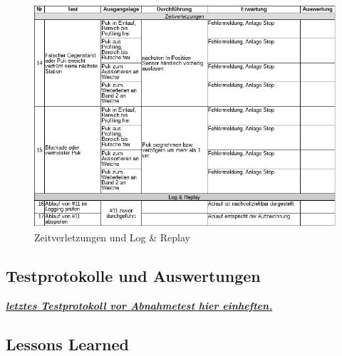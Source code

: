 \documentclass[
   draft=false
  ,paper=a4
  ,twoside=true
  ,fontsize=11pt
  ,headsepline
  ,DIV11
  ,parskip=full+
]{scrartcl} %
\begin{document}
\begin{figure}[H]
	\centering
	\includegraphics[width=1.0\linewidth]{./IMG/Zeitverletzungen}
	\caption{Zeitverletzungen und Log \& Replay}
	\label{fig:zeitverletzungen}
\end{figure}

\subsection{Testprotokolle und Auswertungen}

\begin{center}\underline{\emph{\textbf{letztes Testprotokoll vor Abnahmetest hier einheften.}}}\end{center}

\subsection{Lessons Learned}
\end{document}
